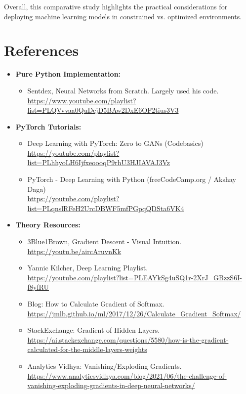\documentclass[12pt]{article}
\begin{document}
Overall, this comparative study highlights the practical considerations for deploying machine learning models in constrained vs. optimized environments.
\newpage
\section*{References}

\begin{itemize}
    \item \textbf{Pure Python Implementation:}
    \begin{itemize}
        \item Sentdex, Neural Networks from Scratch. Largely used his code. \\
        \url{https://www.youtube.com/playlist?list=PLQVvvaa0QuDcjD5BAw2DxE6OF2tius3V3}
    \end{itemize}

    \item \textbf{PyTorch Tutorials:}
    \begin{itemize}
        \item Deep Learning with PyTorch: Zero to GANs (Codebasics) \\
        \url{https://youtube.com/playlist?list=PLhhyoLH6IjfxeoooqP9rhU3HJIAVAJ3Vz}
        \item PyTorch - Deep Learning with Python (freeCodeCamp.org / Akshay Daga) \\
        \url{https://youtube.com/playlist?list=PLqnslRFeH2UrcDBWF5mfPGpqQDSta6VK4}
    \end{itemize}

    \item \textbf{Theory Resources:}
    \begin{itemize}
        \item 3Blue1Brown, Gradient Descent - Visual Intuition. \\
        \url{https://youtu.be/aircAruvnKk}
        \item Yannic Kilcher, Deep Learning Playlist. \\
        \url{https://youtube.com/playlist?list=PLEAYkSg4uSQ1r-2XrJ_GBzzS6I-f8yfRU}
        \item Blog: How to Calculate Gradient of Softmax. \\
        \url{https://jmlb.github.io/ml/2017/12/26/Calculate_Gradient_Softmax/}
        \item StackExchange: Gradient of Hidden Layers. \\
        \url{https://ai.stackexchange.com/questions/5580/how-is-the-gradient-calculated-for-the-middle-layers-weights}
        \item Analytics Vidhya: Vanishing/Exploding Gradients. \\
        \url{https://www.analyticsvidhya.com/blog/2021/06/the-challenge-of-vanishing-exploding-gradients-in-deep-neural-networks/}
    \end{itemize}


\end{itemize}
\end{document}
